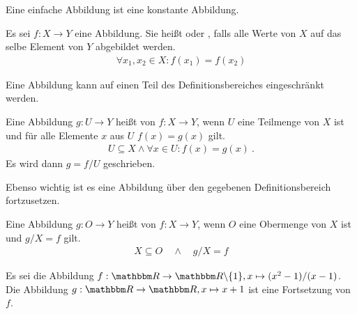 \begin{Unit} 
Eine einfache Abbildung ist eine konstante Abbildung.

\begin{Definition}
  Es sei $f: X \rightarrow Y$ eine Abbildung. Sie heißt 
  oder , falls alle Werte von $X$ auf das 
  selbe Element von $Y$ abgebildet werden.
  \begin{align}
    \forall x_1, x_2 \in X: f(x_1) = f(x_2)
  \end{align}
\end{Definition}
\end{Unit} 

\begin{Unit}
Eine Abbildung kann auf einen Teil des Definitionsbereiches eingeschränkt 
werden.
\begin{Definition}
  Eine Abbildung $g : U \rightarrow Y$ heißt  
  von $f: X \rightarrow Y$, wenn $U$ eine Teilmenge von $X$ ist und für alle 
  Elemente $x$ aus $U$ $f(x) = g(x)$ gilt. 
  \begin{align}
    U \subseteq X \land \forall x \in U: f(x) = g(x) \ .
  \end{align}
  Es wird dann $g = f/U$ geschrieben.
\end{Definition}
\end{Unit} 

\begin{Unit}
Ebenso wichtig ist es eine Abbildung über den gegebenen Definitionsbereich
fortzusetzen.
\begin{Definition}
  Eine Abbildung $g: O \rightarrow Y$ heißt  von 
  $f: X \rightarrow Y$, wenn $O$ eine Obermenge von $X$ ist und $g/X = f$ 
  gilt.
  \begin{align}
    X \subseteq O \quad \land \quad g/X = f
  \end{align}
\end{Definition}
\end{Unit} 

\begin{Unit}[Beispiel] 
  Es sei die Abbildung $f : \RR \rightarrow \RR \backslash \{1\}, x \mapsto
  (x^2 -1 ) / (x - 1)$. Die Abbildung $g : \RR \rightarrow \RR, 
  x \mapsto x+1$ ist eine Fortsetzung von $f$.
\end{Unit}

